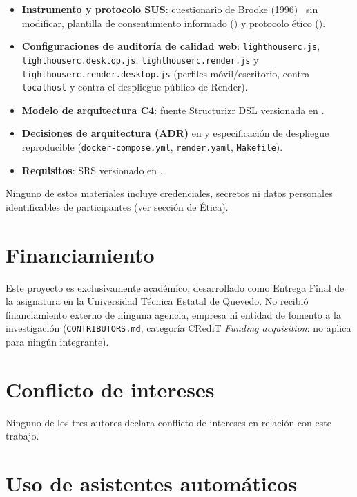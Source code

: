 \begin{itemize}
  \item \textbf{Instrumento y protocolo SUS}: cuestionario de Brooke
    (1996)~\cite{sus-brooke1996} sin modificar, plantilla de
    consentimiento informado ()
    y protocolo \'etico ().
  \item \textbf{Configuraciones de auditor\'ia de calidad web}:
    \texttt{lighthouserc.js}, \texttt{lighthouserc.desktop.js},
    \texttt{lighthouserc.render.js} y \texttt{lighthouserc.render.desktop.js}
    (perfiles m\'ovil/escritorio, contra \texttt{localhost} y contra el
    despliegue p\'ublico de Render).
  \item \textbf{Modelo de arquitectura C4}: fuente Structurizr DSL
    versionada en .
  \item \textbf{Decisiones de arquitectura (ADR)} en 
    y especificaci\'on de despliegue reproducible
    (\texttt{docker-compose.yml}, \texttt{render.yaml}, \texttt{Makefile}).
  \item \textbf{Requisitos}: SRS versionado en .
\end{itemize}

Ninguno de estos materiales incluye credenciales, secretos ni datos
personales identificables de participantes (ver secci\'on de \'Etica).

\section{Financiamiento}

Este proyecto es exclusivamente acad\'emico, desarrollado como Entrega
Final de la asignatura \asignatura{} en la Universidad T\'ecnica Estatal
de Quevedo. No recibi\'o financiamiento externo de ninguna agencia,
empresa ni entidad de fomento a la investigaci\'on (\texttt{CONTRIBUTORS.md},
categor\'ia CRediT \emph{Funding acquisition}: no aplica para ning\'un
integrante).

\section{Conflicto de intereses}

Ninguno de los tres autores declara conflicto de intereses en relaci\'on
con este trabajo.

\section{Uso de asistentes autom\'aticos}

